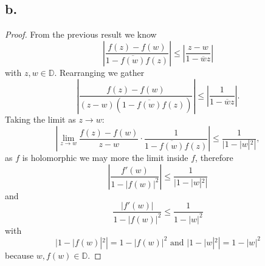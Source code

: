 \documentclass{article}
\begin{document}
\subsection*{b.}
\begin{proof}
  From the previous result we know 
  \[
  \left|\frac{f(z) - f(w)}{1 - \overline{f(w)}f(z)}\right| \leq \left|\frac{z - w}{1 - \overline{w}z}\right|  
  \]
  with $z , w \in \mathbb{D}$. Rearranging we gather
  \[
  \left|\frac{f(z) - f(w)}{(z - w)(1 - \overline{f(w)}f(z))}\right| \leq \left|\frac{1}{1 - \overline{w}z}\right|.  
  \]
  Taking the limit as $z \to w$: 
  \[
  \left|\lim\limits_{z \to w} \frac{f(z) - f(w)}{z - w} \cdot \frac{1}{1 - \overline{f(w)}f(z)} \right| \leq \frac{1}{|1 - |w|^2|}, 
  \]
  as $f$ is holomorphic we may more the limit inside $f$, therefore
  \[
  \left|\frac{f'(w)}{1 - |f(w)|^2} \right| \leq \frac{1}{|1 - |w|^2|}  
  \]
  and 
  \[
  \frac{|f'(w)|}{1 - |f(w)|^2} \leq \frac{1}{1 - |w|^2}  
  \]
  with 
  \[
  |1 - |f(w)|^2| = 1 - |f(w)|^2 \text{ and } |1 - |w|^2| = 1 - |w|^2  
  \]
  because $w, f(w) \in \mathbb{D}$. 
\end{proof}
\end{document}
